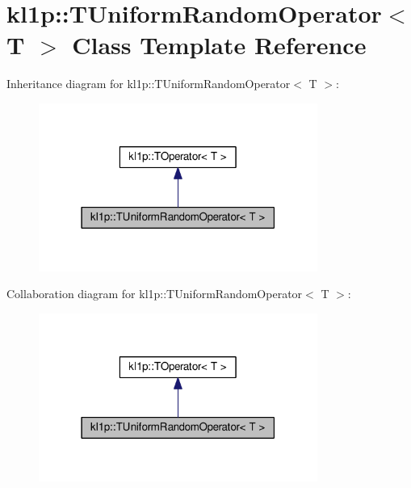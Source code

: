 \hypertarget{classkl1p_1_1TUniformRandomOperator}{}\section{kl1p\+:\+:T\+Uniform\+Random\+Operator$<$ T $>$ Class Template Reference}
\label{classkl1p_1_1TUniformRandomOperator}


Inheritance diagram for kl1p\+:\+:T\+Uniform\+Random\+Operator$<$ T $>$\+:
\nopagebreak
\begin{figure}[H]
\begin{center}
\leavevmode
\includegraphics[width=259pt]{classkl1p_1_1TUniformRandomOperator__inherit__graph}
\end{center}
\end{figure}


Collaboration diagram for kl1p\+:\+:T\+Uniform\+Random\+Operator$<$ T $>$\+:
\nopagebreak
\begin{figure}[H]
\begin{center}
\leavevmode
\includegraphics[width=259pt]{classkl1p_1_1TUniformRandomOperator__coll__graph}
\end{center}
\end{figure}
